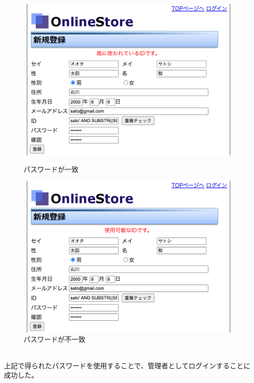 \documentclass[dvipdfmx,autodetect-engine,titlepage]{jsarticle}
\begin{document}
\begin{figure}[H]
  \centering
  \begin{minipage}[b]{0.45\linewidth}
  \begin{center}
    \includegraphics[keepaspectratio,scale=0.3]{sql11.png}
    \end{center}
    \caption{パスワードが一致}
  \end{minipage}
  \begin{minipage}[b]{0.45\linewidth}
  \begin{center}
    \includegraphics[keepaspectratio,scale=0.3]{sql12.png}
    \end{center}
    \caption{パスワードが不一致}
  \end{minipage}
\end{figure}
　\\
上記で得られたパスワードを使用することで、管理者としてログインすることに成功した。
\end{document}
